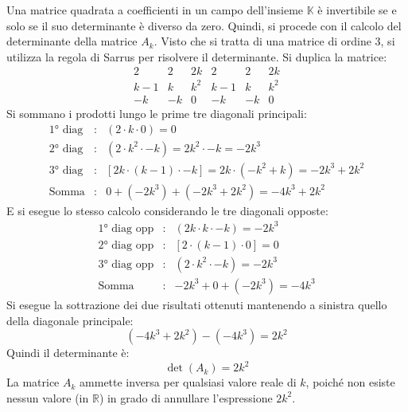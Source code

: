 \documentclass[a4paper]{article}
\begin{document}
	\noindent
	Una matrice quadrata a coefficienti in un campo dell'insieme $\mathbb{K}$ è invertibile se e solo se il suo determinante è diverso da zero. Quindi, si procede con il calcolo del determinante della matrice $A_{k}$. Visto che si tratta di una matrice di ordine $3$, si utilizza la regola di Sarrus per risolvere il determinante. Si duplica la matrice:
	\begin{equation*}
		\begin{matrix}
			2 	& 2		& 2k 	& 2 	& 2 	& 2k 		\\
			k-1 & k 	& k^{2} & k-1 	& k 	& k^{2} 	\\
			-k 	& -k	& 0		& -k 	& -k 	& 0
		\end{matrix}
	\end{equation*}
	Si sommano i prodotti lungo le prime tre diagonali principali:
	\begin{equation*}
		\begin{array}{lll}
			\text{1° diag} & : & \left(2 \cdot k \cdot 0\right) = 0 \\ [0.5em]
			\text{2° diag} & : & \left(2 \cdot k^{2} \cdot -k\right) = 2k^{2} \cdot -k = -2k^{3} \\[0.5em]
			\text{3° diag} & : & \left[2k \cdot \left(k-1\right) \cdot -k\right] = 2k \cdot \left(-k^{2} + k\right) = -2k^{3} + 2k^{2} \\ [0.5em]
			\text{Somma}   & : & 0 + \left(-2k^{3}\right) + \left(-2k^{3} + 2k^{2}\right) = -4k^{3} + 2k^{2}
		\end{array}
	\end{equation*}
	E si esegue lo stesso calcolo considerando le tre diagonali opposte:
	\begin{equation*}
		\begin{array}{lll}
			\text{1° diag opp} & : & \left(2k \cdot k \cdot -k\right) = -2k^{3} \\ [0.5em]
			\text{2° diag opp} & : & \left[2 \cdot \left(k-1\right) \cdot 0\right] = 0  \\ [0.5em]
			\text{3° diag opp} & : & \left(2 \cdot k^{2} \cdot -k\right) = -2k^{3} \\ [0.5em]
			\text{Somma}   & : & -2k^{3} + 0 + \left(-2k^{3}\right) = -4k^{3}
		\end{array}
	\end{equation*}
	Si esegue la sottrazione dei due risultati ottenuti mantenendo a sinistra quello della diagonale principale:
	\begin{equation*}
		\left(-4k^{3} + 2k^{2}\right) - \left(-4k^{3}\right) = 2k^{2}
	\end{equation*}
	Quindi il determinante è:
	\begin{equation*}
		\det\left(A_{k}\right) = 2k^{2}
	\end{equation*}
	La matrice $A_{k}$ ammette inversa per qualsiasi valore reale di $k$, poiché non esiste nessun valore (in $\mathbb{R}$) in grado di annullare l'espressione $2k^{2}$.\newpage
	
\end{document}
